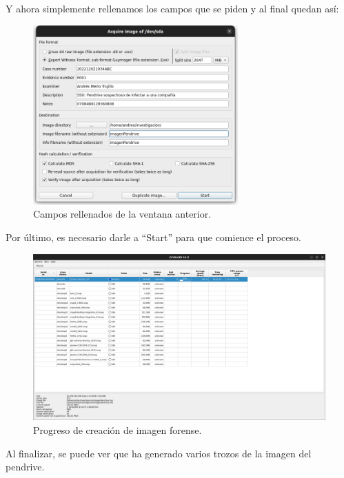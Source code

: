 \documentclass{article}
\begin{document}
\newpage

Y ahora simplemente rellenamos los campos que se piden y al final quedan así:

\begin{figure}[H]
    \centering
    \includegraphics[width=0.7\textwidth]{imagenes/Captura desde 2022-12-02 19-36-04.png}
    \caption{Campos rellenados de la ventana anterior.}
\end{figure}

Por último, es necesario darle a ``Start'' para que comience el proceso.

\begin{figure}[H]
    \centering
    \includegraphics[width=\textwidth]{imagenes/Captura desde 2022-12-02 19-48-29.png}
    \caption{Progreso de creación de imagen forense.}
\end{figure}

\newpage

Al finalizar, se puede ver que ha generado varios trozos de la imagen del pendrive.
\end{document}

